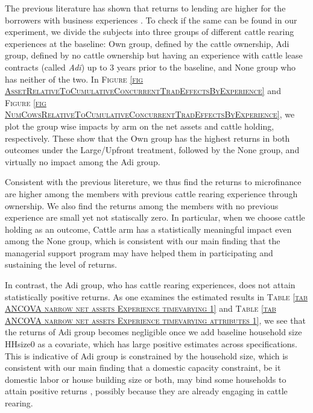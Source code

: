 	The previous literature has shown that returns to lending are higher for the borrowers with business experiences \citep{BanerjeeKarlanZinman2015}. To check if the same can be found in our experiment, we divide the subjects into three groups of different cattle rearing experiences  at the baseline: \textsf{Own} group, defined by the cattle ownership, \textsf{Adi} group, defined by no cattle ownership but having an experience with cattle lease contracts (called \textit{Adi}) up to 3 years prior to the baseline, and \textsf{None} group who has neither of the two. In \textsc{\footnotesize Figure \ref{fig AssetRelativeToCumulativeConcurrentTradEffectsByExperience}} and \textsc{\footnotesize Figure \ref{fig NumCowsRelativeToCumulativeConcurrentTradEffectsByExperience}}, we plot the group wise impacts by arm on the net assets and cattle holding, respectively. These show that the \textsf{Own} group has the highest returns in both outcomes under the \textsf{Large/Upfront} treatment, followed by the \textsf{None} group, and virtually no impact among the \textsf{Adi} group.
	
	Consistent with the previous litereture, we thus find the returns to microfinance are higher among the members with previous cattle rearing experience through ownership. We also find the returns among the members with no previous experience are small yet not statiscally zero. In particular, when we choose cattle holding as an outcome, \textsf{Cattle} arm has a statistically meaningful impact even among the \textsf{None} group, which is consistent with our main finding that the managerial support program may have helped them in participating and sustaining the level of returns. 

	In contrast, the \textsf{Adi} group, who has cattle rearing experiences, does not attain statistically positive returns. As one examines the estimated results in \textsc{\normalsize Table \ref{tab ANCOVA narrow net assets Experience timevarying 1}} and \textsc{\normalsize Table \ref{tab ANCOVA narrow net assets Experience timevarying attributes 1}}, we see that the returns of \textsf{Adi} group becomes negligible once we add baseline household size \textsf{HHsize0} as a covariate, which has large positive estimates across specifications. This is indicative of \textsf{Adi} group is constrained by the household size, which is consistent with our main finding that a domestic capacity constraint, be it domestic labor or house building size or both, may bind some households to attain positive returns	, possibly because they are already engaging in cattle rearing.

